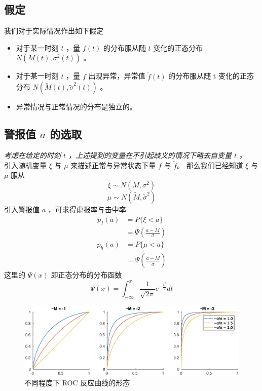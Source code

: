 \documentclass[a4paper]{article}
\begin{document}
\subsection{假定}
我们对于实际情况作出如下假定
\begin{itemize}
    \item 对于某一时刻 $t$ ，量 $f(t)$ 的分布服从随 $t$ 变化的正态分布 $N(M(t), \sigma^2(t))$ 。
    \item 对于某一时刻 $t$ ，量 $f$ 出现异常，异常值 $\tilde{f}(t)$ 的分布服从随 t 变化的正态分布 $N(\tilde{M}(t), \tilde{\sigma}^2(t))$ 。
    \item 异常情况与正常情况的分布是独立的。
\end{itemize}
\subsection{警报值 $a$ 的选取}
\emph{考虑在给定的时刻 $t$ ，上述提到的变量在不引起歧义的情况下略去自变量 $t$ 。}
\\
引入随机变量 $\xi$ 与 $\mu$ 来描述正常与异常状态下量 $f$ 与 $\tilde{f}$。
那么我们已经知道 $\xi$ 与 $\mu$ 服从
\begin{equation}
	\label{eqn:det_xi}
	\xi \sim N(M, \sigma^2)
\end{equation}
\begin{equation}
	\label{eqn:det_mu}
	\mu \sim N(\tilde{M}, \tilde{\sigma}^2)
\end{equation}
引入警报值 $a$ ，可求得虚报率与击中率
\begin{align}
	p_f(a) &= P\{\xi < a\} \\
		&= \Psi(\frac{a-M}{\sigma}) \label{eqn:det-p_f}
\end{align}
\begin{align}
	p_h(a) &= P\{\mu < a\} \\
		&= \Psi(\frac{a-\tilde{M}}{\tilde{\sigma}}) \label{eqn:det-p_h}
\end{align}
这里的 $\Psi(x)$ 即正态分布的分布函数
\begin{equation}
	\label{eqn:psi}
	\Psi(x) = \int_{-\infty}^{x} \frac{1}{\sqrt{2\pi}}e^{-\frac{t^2}{2}} dt
\end{equation}
\begin{figure}[htbp]
	\centering
	\includegraphics[scale=0.6]{pic/tilde-M-tilde-sigma.eps}
	\caption{不同程度下 ROC 反应曲线的形态}
    \label{fig:roc}
\end{figure}
\end{document}
